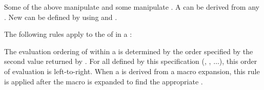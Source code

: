 Some of the  above manipulate 
and some manipulate .
A  can be derived from any .
New  can be defined by using  
and .


%
% 
% 
% 



The following rules apply to the  of  in a
:

\beginlist
{}
The evaluation ordering of  within a 
is determined by the order specified by the second value returned by
. 
For all  defined by this specification
(\eg {}, , $\ldots$),
this order of evaluation is left-to-right.
%
When a  is derived from a macro expansion,
this rule is applied after the macro is expanded to find the appropriate . 

